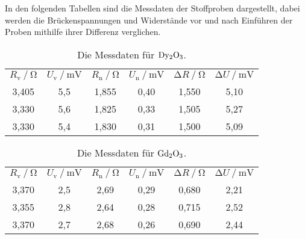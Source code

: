 In den folgenden Tabellen sind die Messdaten der Stoffproben dargestellt, 
dabei werden die Brückenspannungen und Widerstände vor und nach Einführen der Proben mithilfe ihrer Differenz verglichen.
\begin{table}[H]
  \centering
  \caption{Die Messdaten für $\ce{Dy2O3}$.}
  \label{tab:dy}
  \begin{tabular}{c c c c c c}
    \toprule 
    
    \multicolumn{1}{c}{$R_\text{v} \mathbin{/} \unit{\ohm} $} &
    \multicolumn{1}{c}{$U_\text{v} \mathbin{/} \unit{\milli\volt}$} &
    \multicolumn{1}{c}{$R_\text{n} \mathbin{/} \unit{\ohm}$}& 
    \multicolumn{1}{c}{$U_\text{n} \mathbin{/} \unit{\milli\volt}$} &
    \multicolumn{1}{c}{$\increment R \mathbin{/} \unit{\ohm}$}& 
    \multicolumn{1}{c}{$\increment U \mathbin{/} \unit{\milli\volt}$} \\

    \cmidrule(lr){1-2} \cmidrule(lr){3-4} \cmidrule(lr){5-6}

    3,405 & 5,5 & 1,855 & 0,40 & 1,550 & 5,10 \\
    3,330 & 5,6 & 1,825 & 0,33 & 1,505 & 5,27 \\
    3,330 & 5,4 & 1,830 & 0,31 & 1,500 & 5,09 \\
    \bottomrule
  \end{tabular} 
\end{table}

\begin{table}[H]
  \centering
  \caption{Die Messdaten für $\ce{Gd2O3}$.}
  \label{tab:gd}
  \begin{tabular}{c c c c c c}
    \toprule 
    
    \multicolumn{1}{c}{$R_\text{v} \mathbin{/} \unit{\ohm} $} &
    \multicolumn{1}{c}{$U_\text{v} \mathbin{/} \unit{\milli\volt}$} &
    \multicolumn{1}{c}{$R_\text{n} \mathbin{/} \unit{\ohm}$}& 
    \multicolumn{1}{c}{$U_\text{n} \mathbin{/} \unit{\milli\volt}$} &
    \multicolumn{1}{c}{$\increment R \mathbin{/} \unit{\ohm}$}& 
    \multicolumn{1}{c}{$\increment U \mathbin{/} \unit{\milli\volt}$} \\

    \cmidrule(lr){1-2} \cmidrule(lr){3-4} \cmidrule(lr){5-6}

    3,370 & 2,5 & 2,69 & 0,29 &   0,680 &    2,21 \\
    3,355 & 2,8 & 2,64 & 0,28 &   0,715 &    2,52 \\
    3,370 & 2,7 & 2,68 & 0,26 &   0,690 &    2,44 \\
    \bottomrule
  \end{tabular} 
\end{table}

